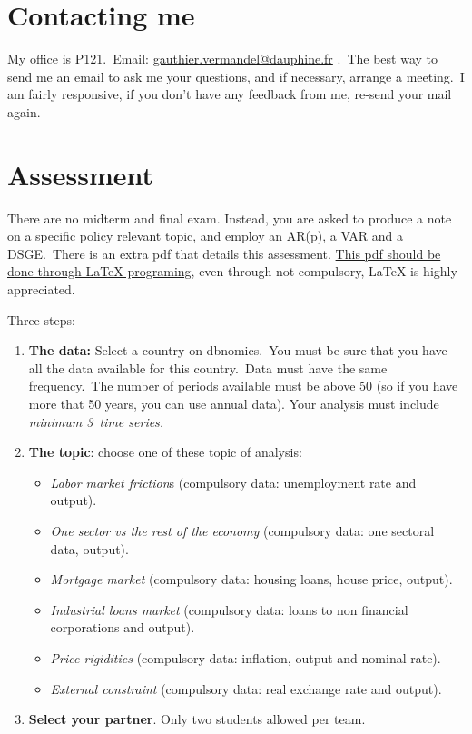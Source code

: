 \documentclass[a4paper,12pt]{article}%
\begin{document}
\section{Contacting me}

My office is P121.\ Email:
\href{mailto:gauthier.vermandel@dauphine.fr}{gauthier.vermandel@dauphine.fr}%
.\ The best way to send me an email to ask me your questions, and if
necessary, arrange a meeting.\ I am fairly responsive, if you don't have any
feedback from me, re-send your mail again.

\section{Assessment}

There are no midterm and final exam. Instead, you are asked to produce a note
on a specific policy relevant topic, and employ an AR(p), a VAR and a
DSGE.\ There is an extra pdf that details this assessment. \underline{This pdf
should be done through LaTeX programing}, even through not compulsory, LaTeX
is highly appreciated.

Three steps:

\begin{enumerate}
\item \textbf{The data:} Select a country on dbnomics.\ You must be sure that
you have all the data available for this country.\ Data must have the same
frequency.\ The number of periods available must be above 50 (so if you have
more that 50 years, you can use annual data). Your analysis must include
\textit{minimum 3\ time series.}

\item \textbf{The topic}: choose one of these topic of analysis:

\begin{itemize}
\item \textit{Labor market friction}s (compulsory data: unemployment rate and output).

\item \textit{One sector vs the rest of the economy} (compulsory data: one
sectoral data, output).

\item \textit{Mortgage market} (compulsory data: housing loans, house price, output).

\item \textit{Industrial loans market} (compulsory data: loans to non
financial corporations and output).

\item \textit{Price rigidities} (compulsory data: inflation, output and
nominal rate).

\item \textit{External constraint} (compulsory data: real exchange rate and output).
\end{itemize}

\item \textbf{Select your partner}. Only two students allowed per team.
\end{enumerate}
\end{document}
